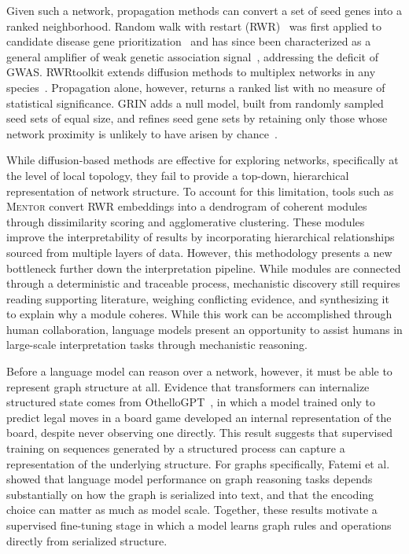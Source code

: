 Given such a network, propagation methods can convert a set of seed genes into a ranked neighborhood. Random walk with restart (RWR)~\cite{tong2006fast} was first applied to candidate disease gene prioritization~\cite{kohler2008walking, vanunu2010associating} and has since been characterized as a general amplifier of weak genetic association signal~\cite{cowen2017network}, addressing the deficit of GWAS. RWRtoolkit extends diffusion methods to multiplex networks in any species~\cite{kainer2025rwrtoolkit}. Propagation alone, however, returns a ranked list with no measure of statistical significance. GRIN adds a null model, built from randomly sampled seed sets of equal size, and refines seed gene sets by retaining only those whose network proximity is unlikely to have arisen by chance~\cite{sullivan2024grin}.

While diffusion-based methods are effective for exploring networks, specifically at the level of local topology, they fail to provide a top-down, hierarchical representation of network structure. To account for this limitation, tools such as \textsc{Mentor} \cite{mentor} convert RWR embeddings into a dendrogram of coherent modules through dissimilarity scoring and agglomerative clustering. These modules improve the interpretability of results by incorporating hierarchical relationships sourced from multiple layers of data. However, this methodology presents a new bottleneck further down the interpretation pipeline. While modules are connected through a deterministic and traceable process, mechanistic discovery still requires reading supporting literature, weighing conflicting evidence, and synthesizing it to explain why a module coheres. While this work can be accomplished through human collaboration, language models present an opportunity to assist humans in large-scale interpretation tasks through mechanistic reasoning.

Before a language model can reason over a network, however, it must be able to represent graph structure at all. Evidence that transformers can internalize structured state comes from OthelloGPT~\cite{othellogpt}, in which a model trained only to predict legal moves in a board game developed an internal representation of the board, despite never observing one directly. This result suggests that supervised training on sequences generated by a structured process can capture a representation of the underlying structure. For graphs specifically, Fatemi et al.~\cite{fatemi2024talk} showed that language model performance on graph reasoning tasks depends substantially on how the graph is serialized into text, and that the encoding choice can matter as much as model scale. Together, these results motivate a supervised fine-tuning stage in which a model learns graph rules and operations directly from serialized structure.

